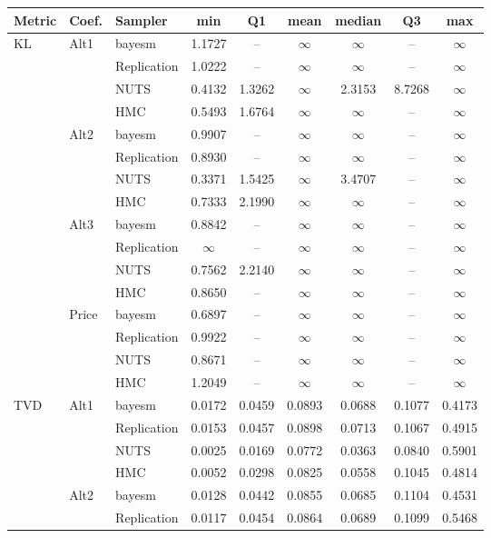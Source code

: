 \begin{tabular}{lllcccccc}
\toprule
Metric & Coef. & Sampler & min & Q1 & mean & median & Q3 & max \\
\midrule
KL & Alt1 & bayesm & 1.1727 & {--} & $\infty$ & $\infty$ & {--} & $\infty$ \\
 &  & Replication & 1.0222 & {--} & $\infty$ & $\infty$ & {--} & $\infty$ \\
 &  & NUTS & 0.4132 & 1.3262 & $\infty$ & 2.3153 & 8.7268 & $\infty$ \\
 &  & HMC & 0.5493 & 1.6764 & $\infty$ & $\infty$ & {--} & $\infty$ \\
 & Alt2 & bayesm & 0.9907 & {--} & $\infty$ & $\infty$ & {--} & $\infty$ \\
 &  & Replication & 0.8930 & {--} & $\infty$ & $\infty$ & {--} & $\infty$ \\
 &  & NUTS & 0.3371 & 1.5425 & $\infty$ & 3.4707 & {--} & $\infty$ \\
 &  & HMC & 0.7333 & 2.1990 & $\infty$ & $\infty$ & {--} & $\infty$ \\
 & Alt3 & bayesm & 0.8842 & {--} & $\infty$ & $\infty$ & {--} & $\infty$ \\
 &  & Replication & $\infty$ & {--} & $\infty$ & $\infty$ & {--} & $\infty$ \\
 &  & NUTS & 0.7562 & 2.2140 & $\infty$ & $\infty$ & {--} & $\infty$ \\
 &  & HMC & 0.8650 & {--} & $\infty$ & $\infty$ & {--} & $\infty$ \\
 & Price & bayesm & 0.6897 & {--} & $\infty$ & $\infty$ & {--} & $\infty$ \\
 &  & Replication & 0.9922 & {--} & $\infty$ & $\infty$ & {--} & $\infty$ \\
 &  & NUTS & 0.8671 & {--} & $\infty$ & $\infty$ & {--} & $\infty$ \\
 &  & HMC & 1.2049 & {--} & $\infty$ & $\infty$ & {--} & $\infty$ \\
TVD & Alt1 & bayesm & 0.0172 & 0.0459 & 0.0893 & 0.0688 & 0.1077 & 0.4173 \\
 &  & Replication & 0.0153 & 0.0457 & 0.0898 & 0.0713 & 0.1067 & 0.4915 \\
 &  & NUTS & 0.0025 & 0.0169 & 0.0772 & 0.0363 & 0.0840 & 0.5901 \\
 &  & HMC & 0.0052 & 0.0298 & 0.0825 & 0.0558 & 0.1045 & 0.4814 \\
 & Alt2 & bayesm & 0.0128 & 0.0442 & 0.0855 & 0.0685 & 0.1104 & 0.4531 \\
 &  & Replication & 0.0117 & 0.0454 & 0.0864 & 0.0689 & 0.1099 & 0.5468 \\

\end{tabular}
